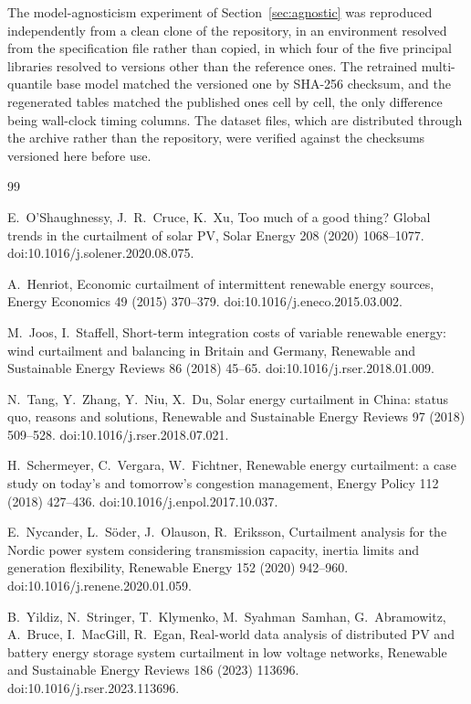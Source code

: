 \documentclass[preprint,3p,times]{elsarticle}
\providecommand{\DIFaddtex}[1]{{\protect\color{blue} \sf #1}} %
\providecommand{\DIFaddbegin}{} %
\providecommand{\DIFaddend}{} %
\providecommand{\DIFadd}[1]{\texorpdfstring{\DIFaddtex{#1}}{#1}} %
\begin{document}
\DIFadd{The model-agnosticism experiment of Section~\ref{sec:agnostic} was reproduced independently from a clean clone of the repository, in an environment resolved from the specification file rather than copied, in which four of the five principal libraries resolved to versions other than the reference ones. The retrained multi-quantile base model matched the versioned one by SHA-256 checksum, and the regenerated tables matched the published ones cell by cell, the only difference being wall-clock timing columns. The dataset files, which are distributed through the archive rather than the repository, were verified against the checksums versioned here before use.
}

\DIFaddend %
\begin{thebibliography}{99}

E.~O'Shaughnessy, J.~R.~Cruce, K.~Xu,
Too much of a good thing? Global trends in the curtailment of solar PV,
Solar Energy 208 (2020) 1068--1077.
\DIFaddbegin \DIFadd{doi:10.1016/j.solener.2020.08.075.
}\DIFaddend 

\DIFaddbegin {}
\DIFadd{A.~Henriot,
Economic curtailment of intermittent renewable energy sources,
Energy Economics 49 (2015) 370--379.
doi:10.1016/j.eneco.2015.03.002.
}

\DIFadd{M.~Joos, I.~Staffell,
Short-term integration costs of variable renewable energy: wind curtailment and balancing in Britain and Germany,
Renewable and Sustainable Energy Reviews 86 (2018) 45--65.
doi:10.1016/j.rser.2018.01.009.
}

\DIFadd{N.~Tang, Y.~Zhang, Y.~Niu, X.~Du,
Solar energy curtailment in China: status quo, reasons and solutions,
Renewable and Sustainable Energy Reviews 97 (2018) 509--528.
doi:10.1016/j.rser.2018.07.021.
}

\DIFadd{H.~Schermeyer, C.~Vergara, W.~Fichtner,
Renewable energy curtailment: a case study on today's and tomorrow's congestion management,
Energy Policy 112 (2018) 427--436.
doi:10.1016/j.enpol.2017.10.037.
}

\DIFadd{E.~Nycander, L.~S\"oder, J.~Olauson, R.~Eriksson,
Curtailment analysis for the Nordic power system considering transmission capacity, inertia limits and generation flexibility,
Renewable Energy 152 (2020) 942--960.
doi:10.1016/j.renene.2020.01.059.
}

\DIFadd{B.~Yildiz, N.~Stringer, T.~Klymenko, M.~Syahman~Samhan, G.~Abramowitz, A.~Bruce, I.~MacGill, R.~Egan,
Real-world data analysis of distributed PV and battery energy storage system curtailment in low voltage networks,
Renewable and Sustainable Energy Reviews 186 (2023) 113696.
doi:10.1016/j.rser.2023.113696.
}


\end{thebibliography}
\end{document}
